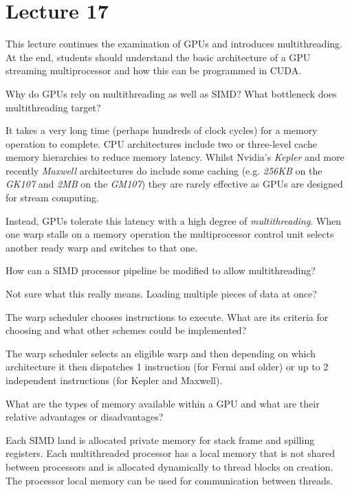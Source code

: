 \documentclass{supervision}
\begin{document}
\section*{Lecture 17}

This lecture continues the examination of GPUs and introduces multithreading. At the end, students should understand the basic architecture of a GPU streaming multiprocessor and how this can be programmed in CUDA.

\begin{questions}
    \question
    Why do GPUs rely on multithreading as well as SIMD? What bottleneck does multithreading target?
    \begin{solution}
    It takes a very long time (perhaps hundreds of clock cycles) for a memory operation to complete. CPU architectures include two or three-level cache memory hierarchies to reduce memory latency. Whilst Nvidia's \textit{Kepler} and more recently \textit{Maxwell} architectures do include some caching (e.g. \textit{256KB} on the \textit{GK107} and \textit{2MB} on the \textit{GM107}) they are rarely effective as GPUs are designed for stream computing.
    
    Instead, GPUs tolerate this latency with a high degree of \textit{multithreading}. When one warp stalls on a memory operation the multiprocessor control unit selects another ready warp and switches to that one.
    \end{solution}

    \question
    How can a SIMD processor pipeline be modified to allow multithreading?
    \begin{solution}
    Not sure what this really means. Loading multiple pieces of data at once?
    \end{solution}

    \question
    The warp scheduler chooses instructions to execute. What are its criteria for choosing and what other schemes could be implemented?
    \begin{solution}
    The warp scheduler selects an eligible warp and then depending on which architecture it then dispatches 1 instruction (for Fermi and older) or up to 2 independent instructions (for Kepler and Maxwell).
    \end{solution}

    \question
    What are the types of memory available within a GPU and what are their relative advantages or disadvantages?
    \begin{solution}
    Each SIMD land is allocated private memory for stack frame and spilling registers. Each multithreaded processor has a local memory that is not shared between processors and is allocated dynamically to thread blocks on creation. The processor local memory can be used for communication between threads.
    

\end{solution}
\end{questions}
\end{document}
